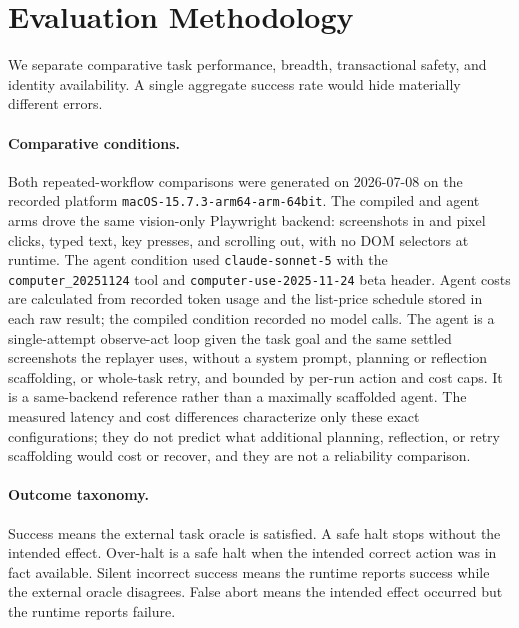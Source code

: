 \section{Evaluation Methodology}
\label{sec:method}

We separate comparative task performance, breadth, transactional safety, and
identity availability. A single aggregate success rate would hide materially
different errors.

\paragraph{Comparative conditions.}
Both repeated-workflow comparisons were generated on 2026-07-08 on the recorded
platform \texttt{macOS-15.7.3-arm64-arm-64bit}. The compiled and agent arms
drove the same vision-only Playwright backend: screenshots in and pixel clicks,
typed text, key presses, and scrolling out, with no DOM selectors at runtime.
The agent condition used \texttt{claude-sonnet-5} with the
\texttt{computer\_20251124} tool and
\texttt{computer-use-2025-11-24} beta header. Agent costs are calculated from
recorded token usage and the list-price schedule stored in each raw result; the
compiled condition recorded no model calls. The agent is a single-attempt
observe-act loop given the task goal and the same settled screenshots the
replayer uses, without a system prompt, planning or reflection scaffolding, or
whole-task retry, and bounded by per-run action and cost caps. It is a
same-backend reference rather than a maximally scaffolded agent. The measured
latency and cost differences characterize only these exact configurations; they
do not predict what additional planning, reflection, or retry scaffolding would
cost or recover, and they are not a reliability comparison.

\paragraph{Outcome taxonomy.}
Success means the external task oracle is satisfied. A safe halt stops without
the intended effect. Over-halt is a safe halt when the intended correct action
was in fact available. Silent incorrect success means the runtime reports
success while the external oracle disagrees. False abort means the intended
effect occurred but the runtime reports failure.

